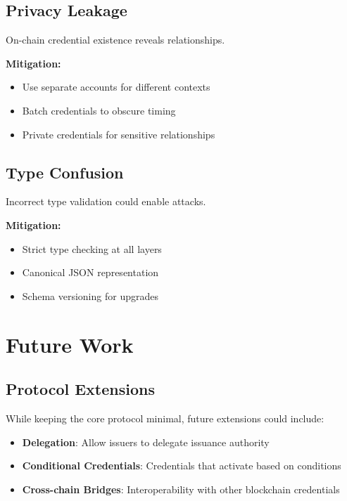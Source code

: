 \documentclass[11pt,a4paper]{article}
\begin{document}
\subsection{Privacy Leakage}

On-chain credential existence reveals relationships. 

\textbf{Mitigation:}
\begin{itemize}
    \item Use separate accounts for different contexts
    \item Batch credentials to obscure timing
    \item Private credentials for sensitive relationships
\end{itemize}

\subsection{Type Confusion}

Incorrect type validation could enable attacks. 

\textbf{Mitigation:}
\begin{itemize}
    \item Strict type checking at all layers
    \item Canonical JSON representation
    \item Schema versioning for upgrades
\end{itemize}

\section{Future Work}

\subsection{Protocol Extensions}

While keeping the core protocol minimal, future extensions could include:

\begin{itemize}
    \item \textbf{Delegation}: Allow issuers to delegate issuance authority
    \item \textbf{Conditional Credentials}: Credentials that activate based on conditions
    \item \textbf{Cross-chain Bridges}: Interoperability with other blockchain credentials
\end{itemize}
\end{document}
